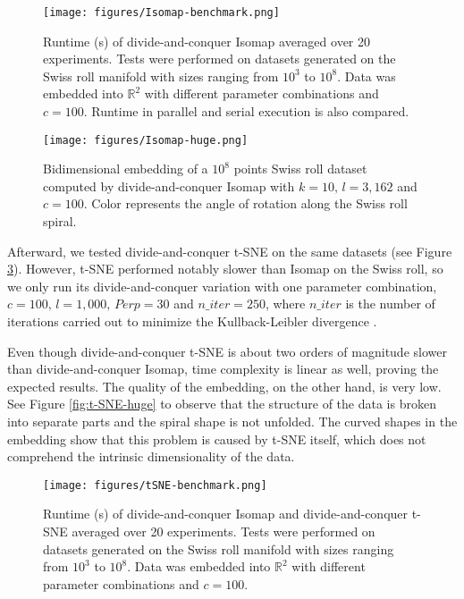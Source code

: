 \begin{figure}
    \centering
    \texttt{[image: figures/Isomap-benchmark.png]}
    \caption{Runtime (s) of divide-and-conquer Isomap averaged over 20 experiments. Tests were performed on datasets generated on the Swiss roll manifold with sizes ranging from $10^3$ to $10^8$. Data was embedded into $\mathbb{R}^2$ with different parameter combinations and $c=100$. Runtime in parallel and serial execution is also compared.}
    \label{fig:Isomap-benchmark}
\end{figure}

\begin{figure}
    \centering
    \texttt{[image: figures/Isomap-huge.png]}
    \caption{Bidimensional embedding of a $10^8$ points Swiss roll dataset computed by divide-and-conquer Isomap with $k=10, \, l=3,162$ and $c=100$. Color represents the angle of rotation along the Swiss roll spiral.}
    \label{fig:Isomap-huge}
\end{figure}

Afterward, we tested divide-and-conquer t-SNE on the same datasets (see Figure \ref{fig:t-SNE-benchmark}). However, t-SNE performed notably slower than Isomap on the Swiss roll, so we only run its divide-and-conquer variation with one parameter combination, $c = 100, \, l=1,000, \, Perp=30$ and $n\_iter=250$, where $n\_iter$ is the number of iterations carried out to minimize the Kullback-Leibler divergence \citep{Kullback1951}.

Even though divide-and-conquer t-SNE is about two orders of magnitude slower than divide-and-conquer Isomap, time complexity is linear as well, proving the expected results. The quality of the embedding, on the other hand, is very low. See Figure \ref{fig:t-SNE-huge} to observe that the structure of the data is broken into separate parts and the spiral shape is not unfolded. The curved shapes in the embedding show that this problem is caused by t-SNE itself, which does not comprehend the intrinsic dimensionality of the data.

\begin{figure}
    \centering
    \texttt{[image: figures/tSNE-benchmark.png]}
    \caption{Runtime (s) of divide-and-conquer Isomap and divide-and-conquer t-SNE averaged over 20 experiments. Tests were performed on datasets generated on the Swiss roll manifold with sizes ranging from $10^3$ to $10^8$. Data was embedded into $\mathbb{R}^2$ with different parameter combinations and $c=100$.}
    \label{fig:t-SNE-benchmark}
\end{figure}

